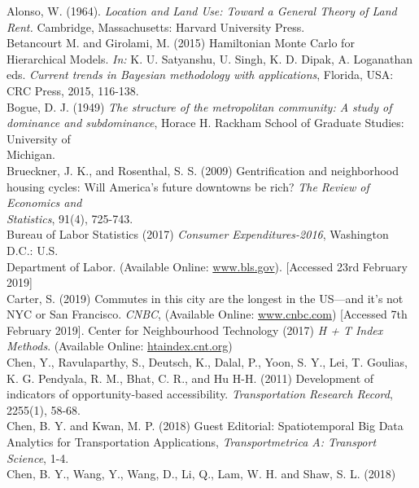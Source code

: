 \documentclass[a4paper,UKenglish]{lipics-v2018}
\begin{document}

Alonso, W. (1964). \textit{Location and Land Use: Toward a General Theory of Land Rent.}
\indent Cambridge, Massachusetts: Harvard University Press. \\
Betancourt M. and Girolami, M. (2015) Hamiltonian Monte Carlo for Hierarchical Models.
\indent \textit{In:} K. U. Satyanshu, U. Singh, K. D. Dipak, A. Loganathan eds. \textit{Current trends in 
\indent Bayesian methodology with applications}, Florida, USA: CRC Press, 2015, 116-138.\\
Bogue, D. J. (1949) \textit{The structure of the metropolitan community: A study of dominance 
\indent and subdominance}, Horace H. Rackham School of Graduate Studies: University of \\
\indent Michigan. \\
Brueckner, J. K., and Rosenthal, S. S. (2009) Gentrification and neighborhood housing 
\indent cycles: Will America's future downtowns be rich? \textit{The Review of Economics and \\
\indent Statistics}, 91(4), 725-743.\\
Bureau of Labor Statistics (2017) \textit{Consumer Expenditures-2016}, Washington D.C.: U.S. \\
\indent Department of Labor. (Available Online: \href{https://www.bls.gov/news.release/pdf/cesan.pdf}{www.bls.gov}). [Accessed 23rd February 2019] \\
Carter, S. (2019) Commutes in this city are the longest in the US—and it’s not NYC or
\indent San Francisco. \textit{CNBC}, (Available Online: \href{https://www.cnbc.com/2019/02/06/commutes-in-this-california-city-are-the-longest-in-the-us.html}{www.cnbc.com}) [Accessed 7th February 2019].
Center for Neighbourhood Technology (2017) \textit{H + T Index Methods}. (Available Online:  
\indent \href{https://htaindex.cnt.org}{htaindex.cnt.org})\\
Chen, Y., Ravulaparthy, S., Deutsch, K., Dalal, P., Yoon, S. Y., Lei, T. Goulias, K. 
\indent G. Pendyala, R. M., Bhat, C. R., and Hu H-H. (2011) Development of indicators of \indent opportunity-based accessibility. \textit{Transportation Research Record}, 2255(1), 58-68. \\
Chen, B. Y. and  Kwan, M. P. (2018) Guest Editorial: Spatiotemporal Big Data Analytics 
\indent for Transportation Applications, \textit{Transportmetrica A: Transport Science}, 1-4.\\
Chen, B. Y., Wang, Y., Wang, D., Li, Q., Lam, W. H. and Shaw, S. L. (2018) \\
\end{document}
